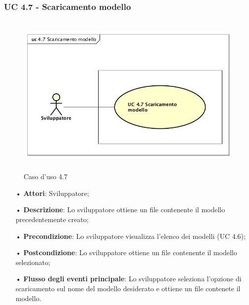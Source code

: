 \subsubsection{UC 4.7 - Scaricamento modello}
\begin{figure}[H]
\centering
\includegraphics[width=17cm, height=8cm]{img/UC470.png} 
\caption{Caso d'uso 4.7}\label{fig:470}
\end{figure}
\begin{itemize}
\item[•]\textbf{Attori}: Sviluppatore;
\item[•]\textbf{Descrizione}: Lo sviluppatore ottiene un file contenente il modello precedentemente creato;
\item[•]\textbf{Precondizione}: Lo sviluppatore visualizza l'elenco dei modelli (UC 4.6);
\item[•]\textbf{Postcondizione}: Lo sviluppatore ottiene un file contenente il modello selezionato;
\item[•]\textbf{Flusso degli eventi principale}:  Lo sviluppatore seleziona l'opzione di scaricamento sul nome del modello desiderato e ottiene un file contenete il modello.
\end{itemize}
